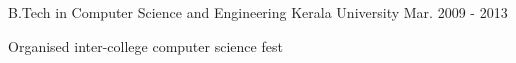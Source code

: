 

\begin{cventries}

  \cventry
    {B.Tech in Computer Science and Engineering } %
    {Kerala University} %
    {} %
    {Mar. 2009 - 2013} %
    {
      \begin{cvitems} %
        \item {Organised inter-college computer science fest}
      \end{cvitems}
    }

\end{cventries}
